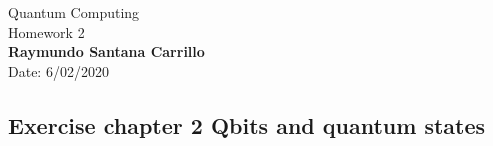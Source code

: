 \documentclass{article}
\begin{document}

\begin{center}
{\Large Quantum Computing \hspace{0.5cm} \\Homework 2}\\
\textbf{Raymundo Santana Carrillo}\\ %
Date: 6/02/2020 %
\end{center}


   


\subsection*{Exercise chapter 2 Qbits and quantum states}
\end{document}
